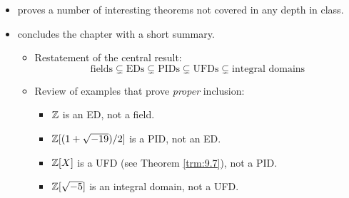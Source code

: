 \documentclass[../notes.tex]{subfiles}
\begin{document}
\begin{itemize}
\begin{itemize}
    \end{itemize}
    \item \textcite{bib:DummitFoote} proves a number of interesting theorems not covered in any depth in class.
    \item \textcite{bib:DummitFoote} concludes the chapter with a short summary.
    \begin{itemize}
        \item Restatement of the central result:
        \begin{equation*}
            \text{fields} \subsetneq \text{EDs}
            \subsetneq \text{PIDs}
            \subsetneq \text{UFDs}
            \subsetneq \text{integral domains}
        \end{equation*}
        \item Review of examples that prove \emph{proper} inclusion:
        \begin{itemize}
            \item $\mathbb{Z}$ is an ED, not a field.
            \item $\mathbb{Z}[(1+\sqrt{-19})/2]$ is a PID, not an ED.
            \item $\mathbb{Z}[X]$ is a UFD (see Theorem \ref{trm:9.7}), not a PID.
            \item $\mathbb{Z}[\sqrt{-5}]$ is an integral domain, not a UFD.
        \end{itemize}
    \end{itemize}
\end{itemize}
\setcounter{proposition}{0}
\end{document}
